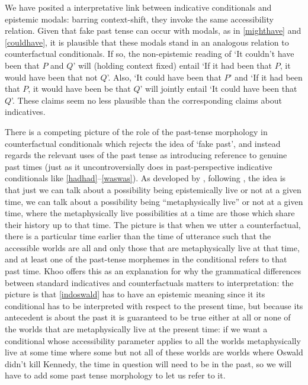 \documentclass[If.tex]{subfiles}
\begin{document}
We have posited a interpretative link between indicative conditionals and epistemic modals: barring context-shift, they invoke the same accessibility relation. Given that fake past tense can occur with modals, as in \ref{mighthave} and \ref{couldhave}, it is plausible that these modals stand in an analogous relation to counterfactual conditionals. If so, the non-epistemic reading of ‘It couldn't have been that $P$ and $Q$’ will (holding context fixed) entail ‘If it had been that $P$, it would have been that not $Q$’. Also, ‘It could have been that $P$’ and ‘If it had been that $P$, it would have been be that $Q$’ will jointly entail ‘It could have been that $Q$’.%
These claims seem no less plausible than the corresponding claims about indicatives.

There is a competing picture of the role of the past-tense morphology in counterfactual conditionals which rejects the idea of ‘fake past’, and instead regards the relevant uses of the past tense as introducing reference to genuine past times (just as it uncontroversially does in past-perspective indicative conditionals like \ref{hadhad}--\ref{waswas}). As developed by \citet{KhooISC}, following \citet{CondoravdiTIM}, the idea is that just we can talk about a possibility being epistemically live or not at a given time, we can talk about a possibility being “metaphysically live” or not at a given time, where the metaphysically live possibilities at a time are those which share their history up to that time. The picture is that when we utter a counterfactual, there is a particular time earlier than the time of utterance such that the accessible worlds are all and only those that are metaphysically live at that time, and at least one of the past-tense morphemes in the conditional refers to that past time.  Khoo offers this as an explanation for why the grammatical differences between standard indicatives and counterfactuals matters to interpretation: the picture is that \ref{indoswald} has to have an epistemic meaning since it its conditional has to be interpreted with respect to the present time, but because its antecedent is about the past it is guaranteed to be true either at all or none of the worlds that are metaphysically live at the present time: if we want a conditional whose accessibility parameter applies to all the worlds metaphysically live at some time where some but not all of these worlds are worlds where Oswald didn't kill Kennedy, the time in question will need to be in the past, so we will have to add some past tense morphology to let us refer to it.  
\end{document}
